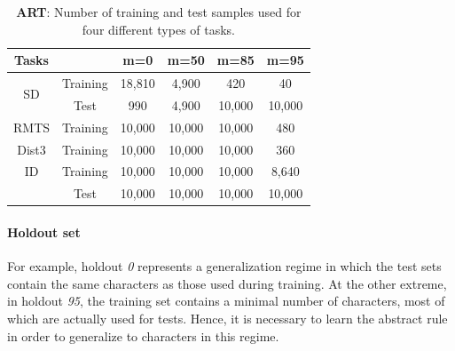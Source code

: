\label{supp:hyper}
\begin{table}[htbp]
\caption{\textbf{ART}: Number of training and test samples used for four different types of tasks.}
\label{tab:artsamples}
\begin{center}
\begin{tabular}{cccccc}
\\\hline
\textbf{Tasks}      &          & m=0    & m=50   & m=85   & m=95   \\ \hline
\multirow{2}{*}{SD} & Training & 18,810 & 4,900  & 420    & 40     \\
                    & Test     & 990    & 4,900  & 10,000 & 10,000 \\ \hline
RMTS                & Training & 10,000 & 10,000 & 10,000 & 480    \\
Dist3               & Training & 10,000 & 10,000 & 10,000 & 360    \\
ID                  & Training & 10,000 & 10,000 & 10,000 & 8,640  \\
                    & Test     & 10,000 & 10,000 & 10,000 & 10,000 \\ \hline
\end{tabular}
\end{center}
\end{table}

\paragraph{Holdout set} For example, holdout \textit{0} represents a generalization regime in which the test sets contain the same characters as those used during training. At the other extreme, in holdout \textit{95}, the training set contains a minimal number of characters, most of which are actually used for tests. Hence, it is necessary to learn the abstract rule in order to generalize to characters in this regime.  

